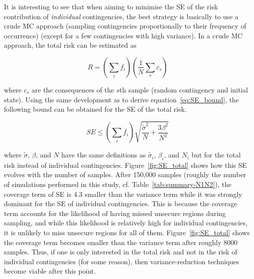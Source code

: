 It is interesting to see that when aiming to minimise the SE of the risk contribution of \emph{individual} contingencies, the best strategy is basically to use a crude MC approach (\ie sampling contingencies proportionally to their frequency of occurrence) (except for a few contingencies with high variance). In a crude MC approach, the total risk can be estimated as

\begin{equation}
  R = \left(\sum_i f_i\right) \left(\frac{1}{N} \sum_s c_s\right)
\end{equation}

\noindent where \(c_s\) are the consequences of the \(s\)th sample (random contingency and initial state). Using the same development as to derive equation~\ref{eq:SE_bound}, the following bound can be obtained for the SE of the total risk.

\begin{equation}
  \label{eq:SE_total}
  SE \leq \left(\sum_i f_i\right) \sqrt{\frac{\tilde{\sigma}^2}{N} + \frac{3 \beta^2}{N^2}}
\end{equation}

\noindent where \(\tilde{\sigma}\), \(\beta\), and \(N\) have the same definitions as \(\tilde{\sigma_i}\), \(\beta_i\), and \(N_i\) but for the total risk instead of individual contingencies. Figure~\ref{fig:SE_total} shows how this SE evolves with the number of samples. After 150,000 samples (roughly the number of simulations performed in this study, cf. Table~\ref{tab:summary-N1N2}), the coverage term of SE is 4.3 smaller than the variance term while it was strongly dominant for the SE of individual contingencies. This is because the coverage term accounts for the likelihood of having missed unsecure regions during sampling, and while this likelihood is relatively high for individual contingencies, it is unlikely to miss unsecure regions for all of them. Figure~\ref{fig:SE_total} shows the coverage term becomes smaller than the variance term after roughly 8000 samples. Thus, if one is only interested in the total risk and not in the risk of individual contingencies (for some reason), then variance-reduction techniques become viable after this point.

